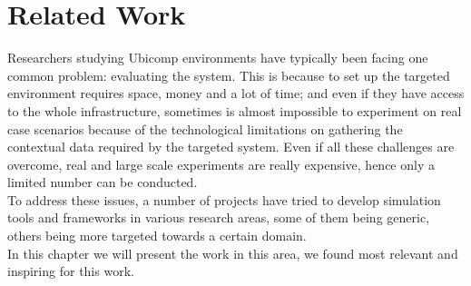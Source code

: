 \chapter{Related Work}\label{ch:related_work}

Researchers studying Ubicomp environments have typically been facing one common problem: evaluating the system. This is because to set up the targeted environment requires space, money and a lot of time; and even if they have access to the whole infrastructure, sometimes is almost impossible to experiment on real case scenarios because of the technological limitations on gathering the contextual data required by the targeted system. Even if all these challenges are overcome, real and large scale experiments are really expensive, hence only a limited number can be conducted.\\

To address these issues, a number of projects have tried to develop simulation tools and frameworks in various research areas, some of them being generic, others being more targeted towards a certain domain.\\

In this chapter we will present the work in this area, we found most relevant and inspiring for this work.

% 











